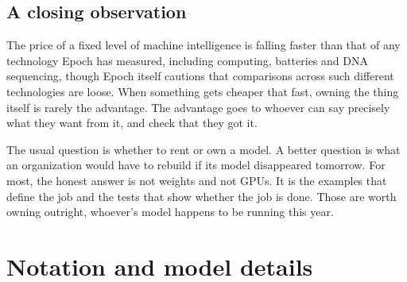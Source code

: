 \subsection{A closing observation}

The price of a fixed level of machine intelligence is falling faster than that of any technology Epoch has measured, including computing, batteries and DNA sequencing, though Epoch itself cautions that comparisons across such different technologies are loose. When something gets cheaper that fast, owning the thing itself is rarely the advantage. The advantage goes to whoever can say precisely what they want from it, and check that they got it.

The usual question is whether to rent or own a model. A better question is what an organization would have to rebuild if its model disappeared tomorrow. For most, the honest answer is not weights and not GPUs. It is the examples that define the job and the tests that show whether the job is done. Those are worth owning outright, whoever's model happens to be running this year.

\appendix

\section{Notation and model details}

